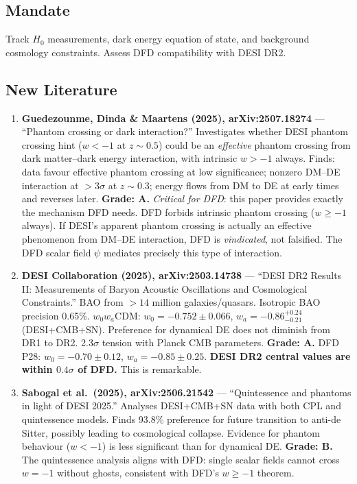 \documentclass[11pt,a4paper]{article}
\begin{document}
\subsection{Mandate}
Track $H_0$ measurements, dark energy equation of state, and background cosmology constraints. Assess DFD compatibility with DESI DR2.

\subsection{New Literature}

\begin{enumerate}

\item \textbf{Guedezounme, Dinda \& Maartens (2025), arXiv:2507.18274} --- ``Phantom crossing or dark interaction?'' Investigates whether DESI phantom crossing hint ($w < -1$ at $z \sim 0.5$) could be an \emph{effective} phantom crossing from dark matter--dark energy interaction, with intrinsic $w > -1$ always. Finds: data favour effective phantom crossing at low significance; nonzero DM--DE interaction at $>3\sigma$ at $z \sim 0.3$; energy flows from DM to DE at early times and reverses later. \textbf{Grade: A.} \emph{Critical for DFD}: this paper provides exactly the mechanism DFD needs. DFD forbids intrinsic phantom crossing ($w \geq -1$ always). If DESI's apparent phantom crossing is actually an effective phenomenon from DM--DE interaction, DFD is \emph{vindicated}, not falsified. The DFD scalar field $\psi$ mediates precisely this type of interaction.

\item \textbf{DESI Collaboration (2025), arXiv:2503.14738} --- ``DESI DR2 Results II: Measurements of Baryon Acoustic Oscillations and Cosmological Constraints.'' BAO from $>14$ million galaxies/quasars. Isotropic BAO precision 0.65\%. $w_0w_a$CDM: $w_0 = -0.752 \pm 0.066$, $w_a = -0.86^{+0.24}_{-0.21}$ (DESI+CMB+SN). Preference for dynamical DE does not diminish from DR1 to DR2. 2.3$\sigma$ tension with Planck CMB parameters. \textbf{Grade: A.} DFD P28: $w_0 = -0.70 \pm 0.12$, $w_a = -0.85 \pm 0.25$. \textbf{DESI DR2 central values are within $0.4\sigma$ of DFD.} This is remarkable.

\item \textbf{Sabogal et al.\ (2025), arXiv:2506.21542} --- ``Quintessence and phantoms in light of DESI 2025.'' Analyses DESI+CMB+SN data with both CPL and quintessence models. Finds 93.8\% preference for future transition to anti-de Sitter, possibly leading to cosmological collapse. Evidence for phantom behaviour ($w < -1$) is less significant than for dynamical DE. \textbf{Grade: B.} The quintessence analysis aligns with DFD: single scalar fields cannot cross $w = -1$ without ghosts, consistent with DFD's $w \geq -1$ theorem.


\end{enumerate}
\end{document}
